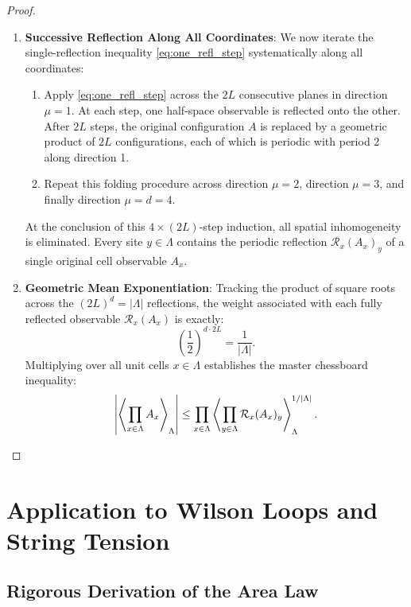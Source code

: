 \begin{proof}
\begin{enumerate}[label=\textbf{Step \arabic*:}, leftmargin=*]
    \item \textbf{Successive Reflection Along All Coordinates}:
    We now iterate the single-reflection inequality \eqref{eq:one_refl_step} systematically along all coordinates:
    \begin{enumerate}[label=(\alph*)]
        \item Apply \eqref{eq:one_refl_step} across the $2L$ consecutive planes in direction $\mu = 1$. At each step, one half-space observable is reflected onto the other. After $2L$ steps, the original configuration $A$ is replaced by a geometric product of $2L$ configurations, each of which is periodic with period 2 along direction 1.
        \item Repeat this folding procedure across direction $\mu = 2$, direction $\mu = 3$, and finally direction $\mu = d = 4$.
    \end{enumerate}
    At the conclusion of this $4 \times (2L)$-step induction, all spatial inhomogeneity is eliminated. Every site $y \in \Lambda$ contains the periodic reflection $\mathcal{R}_x(A_x)_y$ of a single original cell observable $A_x$.

    \item \textbf{Geometric Mean Exponentiation}:
    Tracking the product of square roots across the $(2L)^d = |\Lambda|$ reflections, the weight associated with each fully reflected observable $\mathcal{R}_x(A_x)$ is exactly:
    \begin{equation}
    \left( \frac{1}{2} \right)^{d \cdot 2L} = \frac{1}{|\Lambda|}.
    \end{equation}
    Multiplying over all unit cells $x \in \Lambda$ establishes the master chessboard inequality:
    \begin{equation}
    \left| \left\langle \prod_{x \in \Lambda} A_x \right\rangle_{\Lambda} \right| \le \prod_{x \in \Lambda} \left\langle \prod_{y \in \Lambda} \mathcal{R}_x(A_x)_y \right\rangle_{\Lambda}^{1 / |\Lambda|}. \qedhere
    \end{equation}
\end{enumerate}
\end{proof}

\section{Application to Wilson Loops and String Tension}
\label{sec:wilson_loop_chessboard}

\subsection{Rigorous Derivation of the Area Law}
\label{subsec:area_law_derivation}

